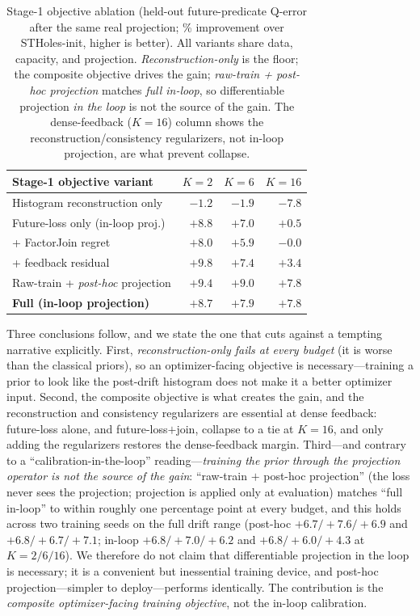 \begin{table}[t]
  \centering\small
  \caption{Stage-1 objective ablation (held-out future-predicate Q-error after the
  same real projection; \% improvement over STHoles-init, higher is better). All
  variants share data, capacity, and projection. \emph{Reconstruction-only} is the
  floor; the composite objective drives the gain; \emph{raw-train + post-hoc
  projection} matches \emph{full in-loop}, so differentiable projection
  \emph{in the loop} is not the source of the gain. The dense-feedback ($K{=}16$)
  column shows the reconstruction/consistency regularizers, not in-loop
  projection, are what prevent collapse.}
  \label{tab:mr_ablation}
  \setlength{\tabcolsep}{6pt}
  \begin{tabular}{l rrr}
    \toprule
    Stage-1 objective variant & $K{=}2$ & $K{=}6$ & $K{=}16$ \\
    \midrule
    Histogram reconstruction only & $-1.2$ & $-1.9$ & $-7.8$ \\
    Future-loss only (in-loop proj.)    & $+8.8$ & $+7.0$ & $+0.5$ \\
    \;\;+ FactorJoin regret             & $+8.0$ & $+5.9$ & $-0.0$ \\
    \;\;+ feedback residual             & $+9.8$ & $+7.4$ & $+3.4$ \\
    Raw-train + \emph{post-hoc} projection & $+9.4$ & $+9.0$ & $+7.8$ \\
    \textbf{Full (in-loop projection)}  & $+8.7$ & $+7.9$ & $+7.8$ \\
    \bottomrule
  \end{tabular}
\end{table}

Three conclusions follow, and we state the one that cuts against a tempting
narrative explicitly. First, \emph{reconstruction-only fails at every budget}
(it is worse than the classical priors), so an optimizer-facing objective is
necessary---training a prior to look like the post-drift histogram does not make
it a better optimizer input. Second, the composite objective is what creates the
gain, and the reconstruction and consistency regularizers are essential at dense
feedback: future-loss alone, and future-loss${+}$join, collapse to a tie at
$K{=}16$, and only adding the regularizers restores the dense-feedback margin.
Third---and contrary to a ``calibration-in-the-loop'' reading---\emph{training
the prior through the projection operator is not the source of the gain}:
``raw-train ${+}$ post-hoc projection'' (the loss never sees the projection;
projection is applied only at evaluation) matches ``full in-loop'' to within
roughly one percentage point at every budget, and this holds across two training seeds on the full
drift range (post-hoc $+6.7/+7.6/+6.9$ and $+6.8/+6.7/+7.1$; in-loop
$+6.8/+7.0/+6.2$ and $+6.8/+6.0/+4.3$ at $K{=}2/6/16$). We therefore do not claim
that differentiable projection in the loop is necessary; it is a convenient but
inessential training device, and post-hoc projection---simpler to
deploy---performs identically. The contribution is the \emph{composite
optimizer-facing training objective}, not the in-loop calibration.

